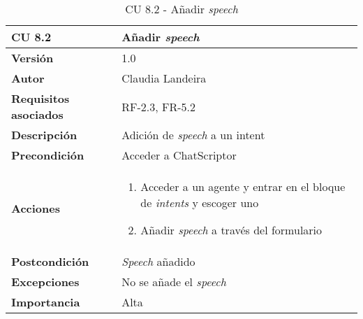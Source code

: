 \begin{table}[p]
	\centering
	\begin{tabularx}{\linewidth}{ p{} p{} }
		\toprule
		\textbf{CU 8.2}    & \textbf{Añadir \textit{speech}}\\
		\toprule
		\textbf{Versión}              & 1.0    \\
		\textbf{Autor}                & Claudia Landeira \\
		\textbf{Requisitos asociados} & RF-2.3, FR-5.2\\
		\textbf{Descripción}          & Adición de \textit{speech} a un intent\\
		\textbf{Precondición}         & Acceder a ChatScriptor\\
		\textbf{Acciones}             &
		\begin{enumerate}
			\def\labelenumi{\arabic{enumi}.}
			\tightlist
                \item Acceder a un agente y entrar en el bloque de \textit{intents} y escoger uno
                \item Añadir \textit{speech} a través del formulario
		\end{enumerate}\\
		\textbf{Postcondición}        & \textit{Speech} añadido  \\
		\textbf{Excepciones}          & No se añade el \textit{speech} \\
		\textbf{Importancia}          & Alta \\
		\bottomrule
	\end{tabularx}
	\caption{CU 8.2 - Añadir \textit{speech}}
\end{table}

